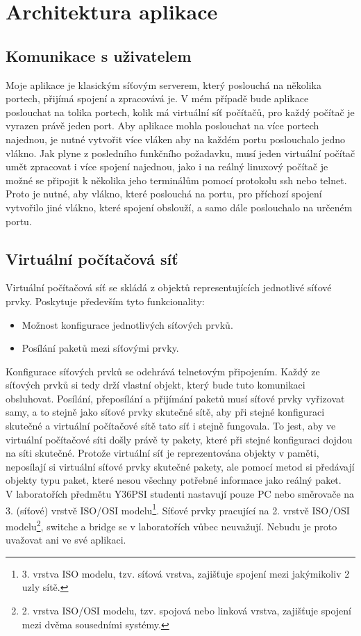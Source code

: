 

\section{Architektura aplikace}

\subsection{Komunikace s uživatelem}

Moje aplikace je klasickým síťovým serverem, který poslouchá na několika portech, přijímá spojení a zpracovává je. V mém případě bude aplikace poslouchat na tolika portech, kolik má virtuální síť počítačů, pro každý počítač je vyrazen právě jeden port. Aby aplikace mohla poslouchat na více portech najednou, je nutné vytvořit více vláken aby na každém portu poslouchalo jedno vlákno. Jak plyne z posledního funkčního požadavku, musí jeden virtuální počítač umět zpracovat i více spojení najednou, jako i na reálný linuxový počítač je možné se připojit k několika jeho terminálům pomocí protokolu ssh nebo telnet. Proto je nutné, aby vlákno, které poslouchá na portu, pro příchozí spojení vytvořilo jiné vlákno, které spojení obslouží, a samo dále poslouchalo na určeném portu. 

\subsection{Virtuální počítačová síť}

Virtuální počítačová síť se skládá z objektů representujících jednotlivé síťové prvky. Poskytuje především tyto funkcionality:
\begin{itemize}
 \item Možnost konfigurace jednotlivých síťových prvků.
 \item Posílání paketů mezi síťovými prvky.
\end{itemize}
Konfigurace síťových prvků se odehrává telnetovým připojením. Každý ze síťových prvků si tedy drží vlastní objekt, který bude tuto komunikaci obsluhovat. Posílání, přeposílání a přijímání paketů musí síťové prvky vyřizovat samy, a to stejně jako síťové prvky skutečné sítě, aby při stejné konfiguraci skutečné a virtuální počítačové sítě tato síť i stejně fungovala. To jest, aby ve virtuální počítačové síti došly právě ty pakety, které při stejné konfiguraci dojdou na síti skutečné. Protože virtuální síť je reprezentována objekty v paměti, neposílají si virtuální síťové prvky skutečné pakety, ale pomocí metod si předávají objekty typu paket, které nesou všechny potřebné informace jako reálný paket.\\
V laboratořích předmětu Y36PSI studenti nastavují pouze PC nebo směrovače na 3. (síťové) vrstvě ISO/OSI modelu\footnote{3. vrstva ISO modelu, tzv. síťová vrstva, zajišťuje spojení mezi jakýmikoliv 2 uzly sítě.}. Síťové prvky pracující na 2. vrstvě ISO/OSI modelu\footnote{2. vrstva ISO/OSI modelu, tzv. spojová nebo linková vrstva, zajišťuje spojení mezi dvěma sousedními systémy.}, switche a bridge se v laboratořích vůbec neuvažují. Nebudu je proto uvažovat ani ve své aplikaci.
